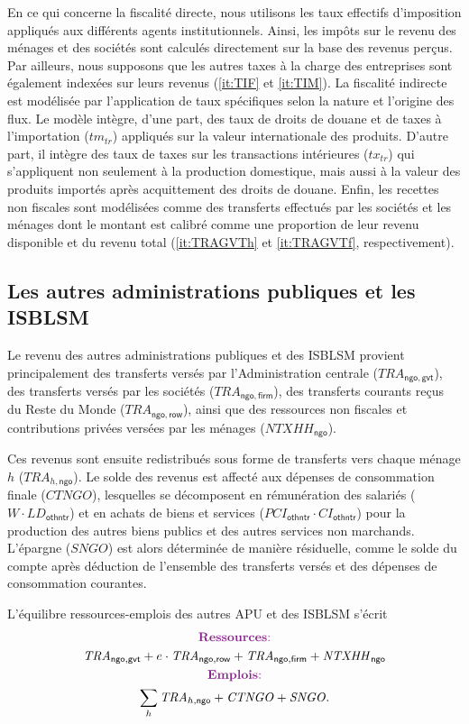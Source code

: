 \documentclass[11pt,a4paper]{article}
\newcommand{\firm}{\mathsf{firm}}
\newcommand{\gvt}{\mathsf{gvt}}
\newcommand{\ngo}{\mathsf{ngo}}
\newcommand{\othntr}{\mathsf{othntr}}
\newcommand{\row}{\mathsf{row}}
\newcommand{\tm}{\mathit{tm}}
\newcommand{\tr}{\mathit{tr}}
\newcommand{\tx}{\mathit{tx}}
\newcommand{\CI}{\mathit{CI}}
\newcommand{\CTNGO}{\mathit{CTNGO}}
\newcommand{\LD}{\mathit{LD}}
\newcommand{\NTXHH}{\mathit{NTXHH}}
\newcommand{\PCI}{\mathit{PCI}}
\newcommand{\SNGO}{\mathit{SNGO}}
\newcommand{\TRA}{\mathit{TRA}}
\begin{document}
	En ce qui concerne la fiscalité directe, nous utilisons les taux effectifs d'imposition appliqués aux différents agents institutionnels. Ainsi, les impôts sur le revenu des ménages et des sociétés sont calculés directement sur la base des revenus perçus. Par ailleurs, nous supposons que les autres taxes à la charge des entreprises sont également indexées sur leurs revenus (\ref{it:TIF} et \ref{it:TIM}). La fiscalité indirecte est modélisée par l'application de taux spécifiques selon la nature et l'origine des flux. Le modèle intègre, d'une part, des taux de droits de douane et de taxes à l'importation ($\tm_{\tr}$) appliqués sur la valeur internationale des produits. D'autre part, il intègre des taux de taxes sur les transactions intérieures ($\tx_{\tr}$) qui s'appliquent non seulement à la production domestique, mais aussi à la valeur des produits importés après acquittement des droits de douane. Enfin, les recettes non fiscales sont modélisées comme des transferts effectués par les sociétés et les ménages dont le montant est calibré comme une proportion de leur revenu disponible et du revenu total (\ref{it:TRAGVTh} et \ref{it:TRAGVTf}, respectivement).
	
	\subsection{Les autres administrations publiques et les ISBLSM}
	Le revenu des autres administrations publiques et des ISBLSM provient principalement des transferts versés par l'Administration centrale ($\TRA_{\ngo,\gvt}$), des transferts versés par les sociétés ($\TRA_{\ngo,\firm}$), des transferts courants reçus du Reste du Monde ($\TRA_{\ngo,\row}$), ainsi que des ressources non fiscales et contributions privées versées par les ménages ($\NTXHH_{\ngo}$).
	
	Ces revenus sont ensuite redistribués sous forme de transferts vers chaque ménage $h$ ($\TRA_{h,\ngo}$). Le solde des revenus est affecté aux dépenses de consommation finale ($\CTNGO$), lesquelles se décomposent en rémunération des salariés ($W\cdot\LD_{\othntr}$) et en achats de biens et services ($\PCI_{\othntr}\cdot\CI_{\othntr}$) pour la production des autres biens publics et des autres services non marchands. L'épargne ($\SNGO$) est alors déterminée de manière résiduelle, comme le solde du compte après déduction de l'ensemble des transferts versés et des dépenses de consommation courantes.
	
	L'équilibre ressources-emplois des autres APU et des ISBLSM s'écrit
	\begin{gather}
		\centerline{\textcolor{Fuchsia}{\textbf{Ressources}:}} \notag\\
		\TRA_{\ngo,\gvt}+ e\cdot\TRA_{\ngo,\row} +\TRA_{\ngo,\firm} + \NTXHH_{\ngo} \notag\\
		\centerline{\textcolor{Fuchsia}{\textbf{Emplois}:}} \notag\\
		\sum_{h}\TRA_{h,\ngo} + \CTNGO + \SNGO.\notag
	\end{gather}	
	
\end{document}
